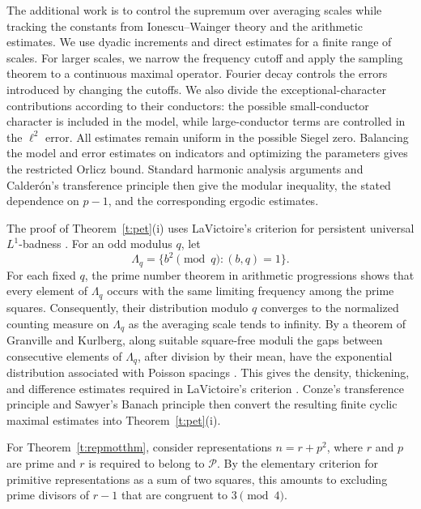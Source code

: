 \documentclass[12pt,reqno]{amsart}
\numberwithin{equation}{section}
\theoremstyle{definition}
\theoremstyle{remark}
\begin{document}
The additional work is to control the supremum over averaging
scales while tracking the constants from Ionescu--Wainger theory
and the arithmetic estimates.
We use dyadic increments and direct estimates for a finite range
of scales. For larger scales, we narrow the frequency cutoff and
apply the sampling theorem to a continuous maximal operator.
Fourier decay controls the errors introduced by changing the
cutoffs. We also divide the exceptional-character contributions
according to their conductors: the possible small-conductor
character is included in the model, while large-conductor terms
are controlled in the \(\ell^2\) error.
All estimates remain uniform in the possible Siegel zero.
Balancing the model and error estimates on indicators and
optimizing the parameters gives the restricted Orlicz bound.
Standard harmonic analysis arguments and Calder\'on's transference
principle then give the modular inequality, the stated dependence
on \(p-1\), and the corresponding ergodic estimates.


The proof of Theorem~\ref{t:pet}\textup{(i)} uses LaVictoire's criterion for
persistent universal \(L^1\)-badness \cite{L09}.  For an odd modulus
\(q\), let
\[
 \Lambda_q=\{b^2\pmod q:(b,q)=1\}.
\]
For each fixed \(q\), the prime number theorem in arithmetic
progressions shows that every element of \(\Lambda_q\) occurs with the
same limiting frequency among the prime squares.  Consequently, their
distribution modulo \(q\) converges to the normalized counting measure
on \(\Lambda_q\) as the averaging scale tends to infinity. By a theorem of Granville and
Kurlberg, along suitable square-free moduli the gaps between consecutive
elements of \(\Lambda_q\), after division by their mean, have the
exponential distribution associated with Poisson spacings
\cite{GK08}.  This gives the density, thickening, and difference
estimates required in LaVictoire's criterion \cite[Section 3]{L09}.  Conze's transference
principle and Sawyer's Banach principle then convert the resulting
finite cyclic maximal estimates into Theorem~\ref{t:pet}\textup{(i)}.




\medskip



For Theorem~\ref{t:repmotthm}, consider representations
\(n=r+p^2\), where \(r\) and \(p\) are prime and \(r\) is required to
belong to \(\mathcal P\).  By the elementary criterion for primitive
representations as a sum of two squares, this amounts to excluding
prime divisors of \(r-1\) that are congruent to \(3\pmod4\).
\end{document}
